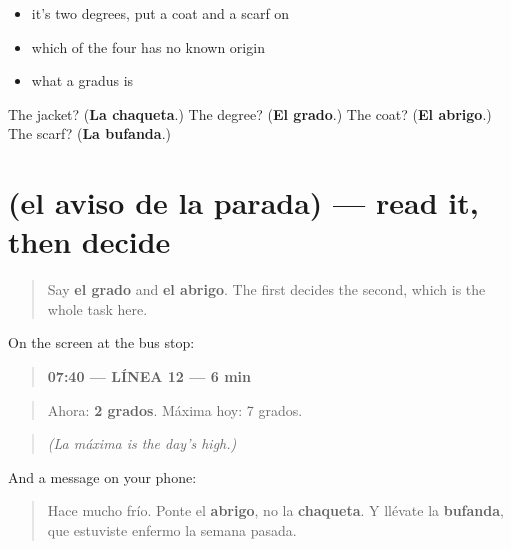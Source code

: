 \begin{itemize}
\raggedright
  \item it's two degrees, put a coat and a scarf on
  \item which of the four has no known origin
  \item what a gradus is
\end{itemize}

\begin{tcolorbox}[breakable,colback=teal!4,colframe=teal!35!black,title={Before you move on}]
The jacket? (\textbf{La chaqueta}.) The degree? (\textbf{El grado}.) The coat? (\textbf{El abrigo}.) The scarf? (\textbf{La bufanda}.)
\end{tcolorbox}
\section[Practice]{(el aviso de la parada) — read it, then decide}

\label{lesson:ES-C468-sintesis-abrigo}



\begin{quote}
Say \textbf{el grado} and \textbf{el abrigo}. The first decides the second, which is the whole task here.
\end{quote}

\begin{tcolorbox}[breakable,skin=enhanced,colback=orange!6,colframe=orange!45!black,boxrule=0.5pt,arc=1mm,left=6pt,right=6pt,top=4pt,bottom=4pt,fonttitle=\bfseries,title={Read this}]
On the screen at the bus stop:

\begin{quote}
\textbf{07:40 — LÍNEA 12 — 6 min}
\end{quote}

\begin{quote}
Ahora: \textbf{2 grados}. Máxima hoy: 7 grados.
\end{quote}

\begin{quote}
\emph{(La máxima is the day's high.)}
\end{quote}

And a message on your phone:

\begin{quote}
Hace mucho frío. Ponte el \textbf{abrigo}, no la \textbf{chaqueta}. Y llévate la \textbf{bufanda}, que estuviste enfermo la semana pasada.
\end{quote}
\end{tcolorbox}


